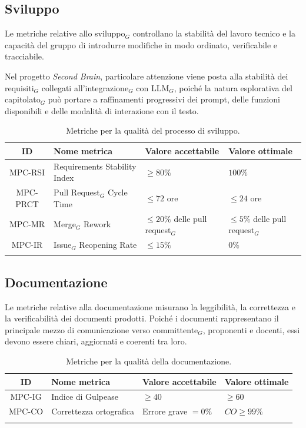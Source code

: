 \documentclass[a4paper, 10pt, colorlinks=true, linkcolor=black, urlcolor=blue, citecolor=blue, hidelinks]{article}
\begin{document}
\subsection{Sviluppo}

Le metriche relative allo sviluppo$_G$ controllano la stabilità del lavoro tecnico e la capacità del gruppo di introdurre modifiche in modo ordinato, verificabile e tracciabile.

Nel progetto \textit{Second Brain}, particolare attenzione viene posta alla stabilità dei requisiti$_G$ collegati all'integrazione$_G$ con LLM$_G$, poiché la natura esplorativa del capitolato$_G$ può portare a raffinamenti progressivi dei prompt, delle funzioni disponibili e delle modalità di interazione con il testo.

\begingroup
\small
\renewcommand{\arraystretch}{1.25}
\begin{longtable}{|c|p{4cm}|p{3cm}|p{3cm}|}
    \hline
    \textbf{ID} & \textbf{Nome metrica} & \textbf{Valore accettabile} & \textbf{Valore ottimale} \\
    \hline
    \endhead

    MPC-RSI & Requirements Stability Index & $\geq 80\%$ & $100\%$ \\ \hline
    MPC-PRCT & Pull Request$_G$ Cycle Time & $\leq 72$ ore & $\leq 24$ ore \\ \hline
    MPC-MR & Merge$_G$ Rework & $\leq 20\%$ delle pull request$_G$ & $\leq 5\%$ delle pull request$_G$ \\ \hline
    MPC-IR & Issue$_G$ Reopening Rate & $\leq 15\%$ & $0\%$ \\ \hline

    \caption{Metriche per la qualità del processo di sviluppo.}
    \label{tab:metriche-sviluppo}
\end{longtable}
\endgroup

\subsection{Documentazione}

Le metriche relative alla documentazione misurano la leggibilità, la correttezza e la verificabilità dei documenti prodotti. Poiché i documenti rappresentano il principale mezzo di comunicazione verso committente$_G$, proponenti e docenti, essi devono essere chiari, aggiornati e coerenti tra loro.

\begingroup
\small
\renewcommand{\arraystretch}{1.25}
\begin{longtable}{|c|p{4cm}|p{3cm}|p{3cm}|}
    \hline
    \textbf{ID} & \textbf{Nome metrica} & \textbf{Valore accettabile} & \textbf{Valore ottimale} \\
    \hline
    \endhead

    MPC-IG & Indice di Gulpease & $\geq 40$ & $\geq 60$ \\ \hline
    MPC-CO & Correttezza ortografica & Errore grave $=0\%$ & $CO \geq 99\% $ \\ \hline

    \caption{Metriche per la qualità della documentazione.}
    \label{tab:metriche-documentazione}
\end{longtable}
\endgroup
\end{document}
